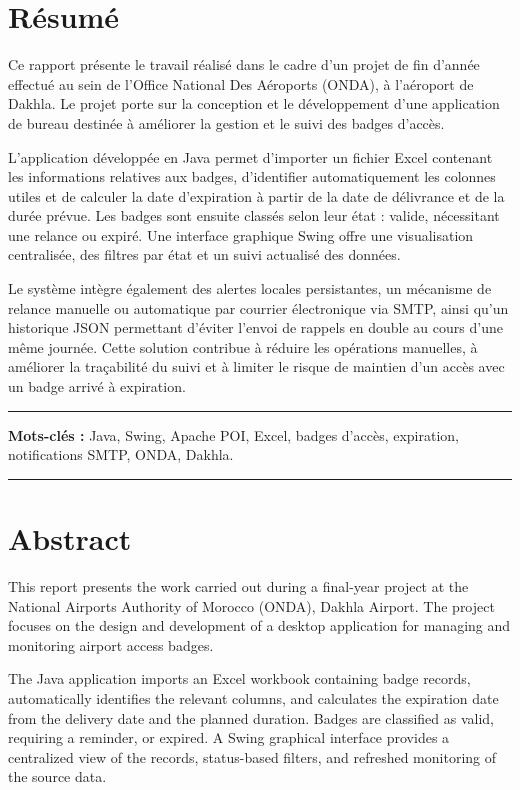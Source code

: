 \documentclass[12pt,a4paper,openany]{report}
\newcommand{\frontchapter}[1]{%
  \chapter*{#1}%
  \addcontentsline{toc}{chapter}{#1}%
}
\begin{document}
\frontchapter{Résumé}

Ce rapport présente le travail réalisé dans le cadre d'un projet de fin d'année
effectué au sein de l'Office National Des Aéroports (ONDA), à l'aéroport de
Dakhla. Le projet porte sur la conception et le développement d'une application
de bureau destinée à améliorer la gestion et le suivi des badges d'accès.

L'application développée en Java permet d'importer un fichier Excel contenant
les informations relatives aux badges, d'identifier automatiquement les
colonnes utiles et de calculer la date d'expiration à partir de la date de
délivrance et de la durée prévue. Les badges sont ensuite classés selon leur
état : valide, nécessitant une relance ou expiré. Une interface graphique
Swing offre une visualisation centralisée, des filtres par état et un suivi
actualisé des données.

Le système intègre également des alertes locales persistantes, un mécanisme de
relance manuelle ou automatique par courrier électronique via SMTP, ainsi qu'un
historique JSON permettant d'éviter l'envoi de rappels en double au cours d'une
même journée. Cette solution contribue à réduire les opérations manuelles, à
améliorer la traçabilité du suivi et à limiter le risque de maintien d'un accès
avec un badge arrivé à expiration.

\vspace{0.5cm}
\noindent\rule{\linewidth}{0.4pt}

\vspace{0.2cm}
\noindent\textbf{Mots-clés :} Java, Swing, Apache POI, Excel, badges d'accès, expiration, notifications SMTP, ONDA, Dakhla.

\vspace{0.2cm}
\noindent\rule{\linewidth}{0.4pt}


\frontchapter{Abstract}

This report presents the work carried out during a final-year project at the
National Airports Authority of Morocco (ONDA), Dakhla Airport. The project
focuses on the design and development of a desktop application for managing and
monitoring airport access badges.

The Java application imports an Excel workbook containing badge records,
automatically identifies the relevant columns, and calculates the expiration
date from the delivery date and the planned duration. Badges are classified as
valid, requiring a reminder, or expired. A Swing graphical interface provides a
centralized view of the records, status-based filters, and refreshed monitoring
of the source data.
\end{document}
